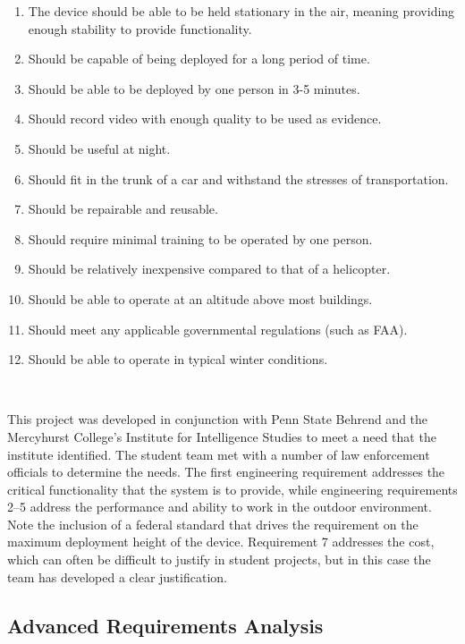 \begin{longtable}[]
{\begin{minipage}[t]{\linewidth}
\begin{enumerate}
\def\labelenumi{\arabic{enumi}.}
\item
  The device should be able to be held stationary in the air, meaning
  providing enough stability to provide functionality.
\item
  Should be capable of being deployed for a long period of time.
\item
  Should be able to be deployed by one person in 3-5 minutes.
\item
  Should record video with enough quality to be used as evidence.
\item
  Should be useful at night.
\item
  Should fit in the trunk of a car and withstand the stresses of
  transportation.
\item
  Should be repairable and reusable.
\item
  Should require minimal training to be operated by one person.
\item
  Should be relatively inexpensive compared to that of a helicopter.
\item
  Should be able to operate at an altitude above most buildings.
\item
  Should meet any applicable governmental regulations (such as FAA).
\item
  Should be able to operate in typical winter conditions.
\end{enumerate}
\end{minipage}} \\
\end{longtable}

This project was developed in conjunction with Penn State Behrend and
the Mercyhurst College's Institute for Intelligence Studies to meet a
need that the institute identified. The student team met with a number
of law enforcement officials to determine the needs. The first
engineering requirement addresses the critical functionality that the
system is to provide, while engineering requirements 2--5 address the
performance and ability to work in the outdoor environment. Note the
inclusion of a federal standard that drives the requirement on the
maximum deployment height of the device. Requirement 7 addresses the
cost, which can often be difficult to justify in student projects, but
in this case the team has developed a clear justification.

\subsection{Advanced Requirements
Analysis}\label{advanced-requirements-analysis}


